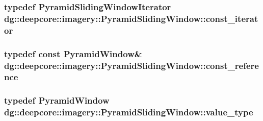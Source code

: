 \subsubsection[{\texorpdfstring{const\+\_\+iterator}{const_iterator}}]{\setlength{\rightskip}{0pt plus 5cm}typedef {\bf Pyramid\+Sliding\+Window\+Iterator} {\bf dg\+::deepcore\+::imagery\+::\+Pyramid\+Sliding\+Window\+::const\+\_\+iterator}}\hypertarget{classdg_1_1deepcore_1_1imagery_1_1_pyramid_sliding_window_ac39f725e03255cd3776e47672a02e78f}{}\label{classdg_1_1deepcore_1_1imagery_1_1_pyramid_sliding_window_ac39f725e03255cd3776e47672a02e78f}
\subsubsection[{\texorpdfstring{const\+\_\+reference}{const_reference}}]{\setlength{\rightskip}{0pt plus 5cm}typedef const {\bf Pyramid\+Window}\& {\bf dg\+::deepcore\+::imagery\+::\+Pyramid\+Sliding\+Window\+::const\+\_\+reference}}\hypertarget{classdg_1_1deepcore_1_1imagery_1_1_pyramid_sliding_window_a2607e7416973611462d45f5a3772b46e}{}\label{classdg_1_1deepcore_1_1imagery_1_1_pyramid_sliding_window_a2607e7416973611462d45f5a3772b46e}
\subsubsection[{\texorpdfstring{value\+\_\+type}{value_type}}]{\setlength{\rightskip}{0pt plus 5cm}typedef {\bf Pyramid\+Window} {\bf dg\+::deepcore\+::imagery\+::\+Pyramid\+Sliding\+Window\+::value\+\_\+type}}\hypertarget{classdg_1_1deepcore_1_1imagery_1_1_pyramid_sliding_window_ab19431f1af5d94cf35d3c13e62831b0a}{}\label{classdg_1_1deepcore_1_1imagery_1_1_pyramid_sliding_window_ab19431f1af5d94cf35d3c13e62831b0a}
